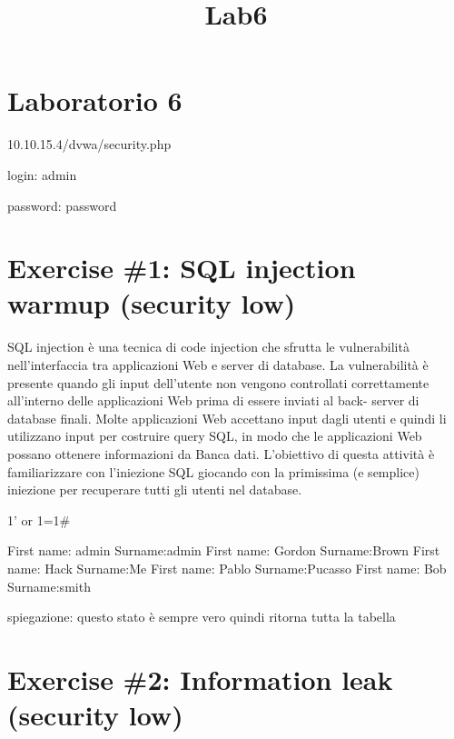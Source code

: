 \documentclass[11pt]{article}
\title{Lab6}
\begin{document}
    
    
    \maketitle
    
    

    
    \hypertarget{laboratorio-6}{%
\section{Laboratorio 6}\label{laboratorio-6}}

    10.10.15.4/dvwa/security.php

login: admin

password: password

    \hypertarget{exercise-1-sql-injection-warmup-security-low}{%
\section{Exercise \#1: SQL injection warmup (security
low)}\label{exercise-1-sql-injection-warmup-security-low}}

    SQL injection è una tecnica di code injection che sfrutta le
vulnerabilità nell'interfaccia tra applicazioni Web e server di
database. La vulnerabilità è presente quando gli input dell'utente non
vengono controllati correttamente all'interno delle applicazioni Web
prima di essere inviati al back- server di database finali. Molte
applicazioni Web accettano input dagli utenti e quindi li utilizzano
input per costruire query SQL, in modo che le applicazioni Web possano
ottenere informazioni da Banca dati. L'obiettivo di questa attività è
familiarizzare con l'iniezione SQL giocando con la primissima (e
semplice) iniezione per recuperare tutti gli utenti nel database.

    1' or 1=1\#

First name: admin Surname:admin First name: Gordon Surname:Brown First
name: Hack Surname:Me First name: Pablo Surname:Pucasso First name: Bob
Surname:smith

spiegazione: questo stato è sempre vero quindi ritorna tutta la tabella

    \hypertarget{exercise-2-information-leak-security-low}{%
\section{Exercise \#2: Information leak (security
low)}\label{exercise-2-information-leak-security-low}}
\end{document}
